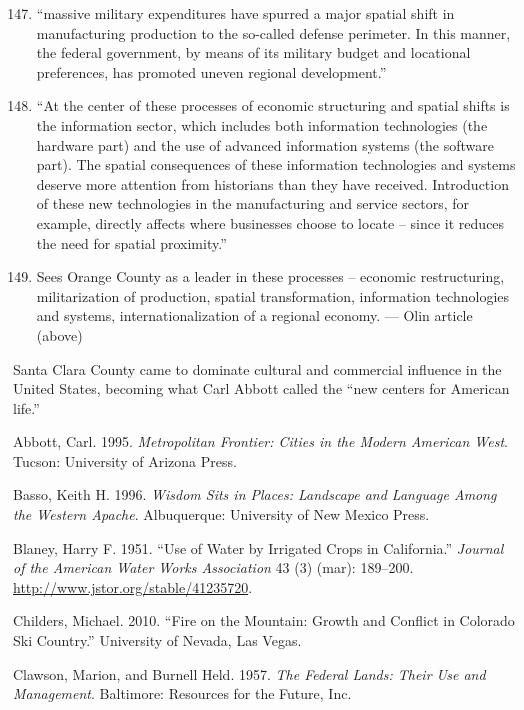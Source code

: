 \documentclass[11pt,article,oneside]{memoir}
\begin{document}
\begin{enumerate}[(1)]
\setcounter{enumi}{146}
\item
  ``massive military expenditures have spurred a major spatial shift in
  manufacturing production to the so-called defense perimeter. In this
  manner, the federal government, by means of its military budget and
  locational preferences, has promoted uneven regional development.''
\item
  ``At the center of these processes of economic structuring and spatial
  shifts is the information sector, which includes both information
  technologies (the hardware part) and the use of advanced information
  systems (the software part). The spatial consequences of these
  information technologies and systems deserve more attention from
  historians than they have received. Introduction of these new
  technologies in the manufacturing and service sectors, for example,
  directly affects where businesses choose to locate -- since it reduces
  the need for spatial proximity.''
\item
  Sees Orange County as a leader in these processes -- economic
  restructuring, militarization of production, spatial transformation,
  information technologies and systems, internationalization of a
  regional economy. --- Olin article (above)
\end{enumerate}

Santa Clara County came to dominate cultural and commercial influence in
the United States, becoming what Carl Abbott called the ``new centers
for American life.''

Abbott, Carl. 1995. \emph{Metropolitan Frontier: Cities in the Modern
American West}. Tucson: University of Arizona Press.

Basso, Keith H. 1996. \emph{Wisdom Sits in Places: Landscape and
Language Among the Western Apache}. Albuquerque: University of New
Mexico Press.

Blaney, Harry F. 1951. ``Use of Water by Irrigated Crops in
California.'' \emph{Journal of the American Water Works Association} 43
(3) (mar): 189--200.
\href{http://www.jstor.org/stable/41235720}{http://www.jstor.org/stable/41235720}.

Childers, Michael. 2010. ``Fire on the Mountain: Growth and Conflict in
Colorado Ski Country.'' University of Nevada, Las Vegas.

Clawson, Marion, and Burnell Held. 1957. \emph{The Federal Lands: Their
Use and Management}. Baltimore: Resources for the Future, Inc.
\end{document}

